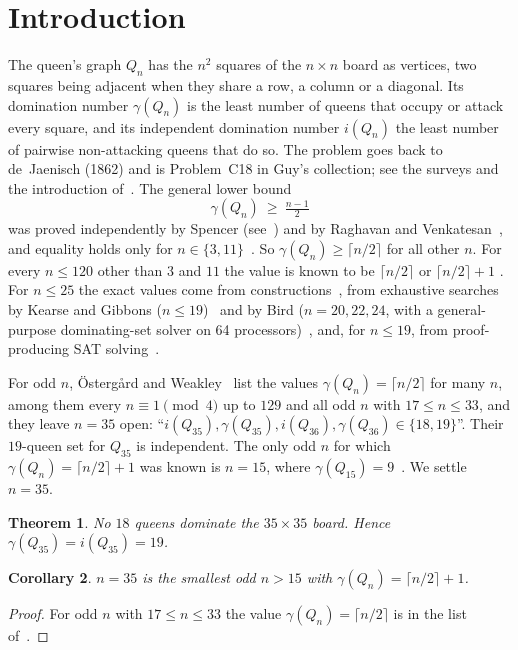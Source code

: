 \documentclass[11pt]{article}
\newtheorem{theorem}{Theorem}[section]
\newtheorem{corollary}[theorem]{Corollary}
\theoremstyle{definition}
\theoremstyle{remark}
\begin{document}
\section{Introduction}\label{sec:intro}

The queen's graph $Q_n$ has the $n^2$ squares of the $n\times n$ board as vertices, two squares being
adjacent when they share a row, a column or a diagonal. Its domination number $\gamma(Q_n)$ is the least
number of queens that occupy or attack every square, and its independent domination number $i(Q_n)$ the
least number of pairwise non-attacking queens that do so. The problem goes back to de~Jaenisch (1862)
and is Problem~C18 in Guy's collection; see the surveys \cite{Cockayne,Watkins} and the introduction
of~\cite{Weakley2022}. The general lower bound
\[
  \gamma(Q_n)\ \ge\ \tfrac{n-1}{2}
\]
was proved independently by Spencer (see~\cite{Cockayne}) and by Raghavan and Venkatesan~\cite{RV}, and
equality holds only for $n\in\{3,11\}$~\cite{Weakley2002,FW}. So $\gamma(Q_n)\ge\lceil n/2\rceil$ for all
other $n$. For every $n\le120$ other than $3$ and $11$ the value is known to be $\lceil n/2\rceil$ or
$\lceil n/2\rceil+1$ \cite{OW,Weakley2022}. For $n\le25$ the exact values come from constructions~\cite{OW,Kearse},
from exhaustive searches by Kearse and Gibbons ($n\le19$)~\cite{Kearse} and by Bird ($n=20,22,24$, with a
general-purpose dominating-set solver on 64 processors)~\cite{Bird}, and, for $n\le19$, from
proof-producing SAT solving~\cite{RB}.

For odd $n$, \"Osterg\aa rd and Weakley~\cite{OW} list the values $\gamma(Q_n)=\lceil n/2\rceil$ for many
$n$, among them every $n\equiv1\pmod4$ up to $129$ and all odd $n$ with $17\le n\le33$, and they leave
$n=35$ open: ``$i(Q_{35}),\gamma(Q_{35}),i(Q_{36}),\gamma(Q_{36})\in\{18,19\}$''. Their $19$-queen set
for $Q_{35}$ is independent. The only odd $n$ for which $\gamma(Q_n)=\lceil n/2\rceil+1$ was known is
$n=15$, where $\gamma(Q_{15})=9$~\cite{Kearse}. We settle $n=35$.

\begin{theorem}\label{thm:main}
No $18$ queens dominate the $35\times35$ board. Hence $\gamma(Q_{35})=i(Q_{35})=19$.
\end{theorem}

\begin{corollary}\label{cor:odd}
$n=35$ is the smallest odd $n>15$ with $\gamma(Q_n)=\lceil n/2\rceil+1$.
\end{corollary}
\begin{proof}
For odd $n$ with $17\le n\le33$ the value $\gamma(Q_n)=\lceil n/2\rceil$ is in the list of~\cite{OW}.
\end{proof}
\end{document}
